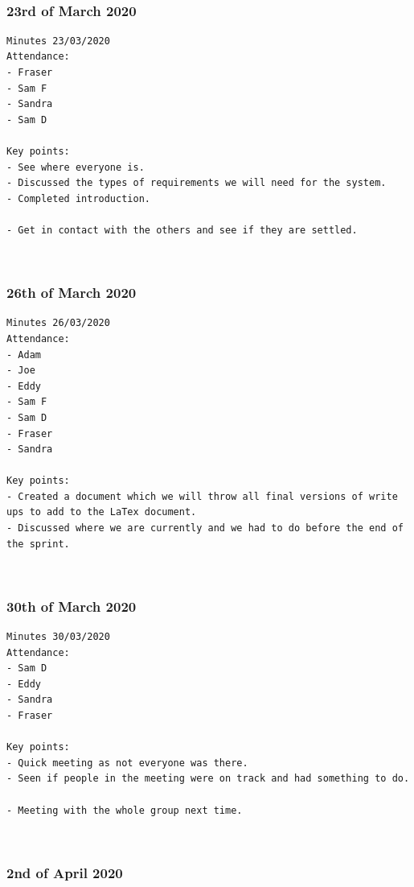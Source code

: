 \documentclass[10pt, notitlepage]{report}
\begin{document}
\leavevmode \\
\subsubsection{23rd of March 2020}

\begin{lstlisting}
Minutes 23/03/2020
Attendance:
- Fraser
- Sam F
- Sandra
- Sam D

Key points:
- See where everyone is. 
- Discussed the types of requirements we will need for the system.
- Completed introduction.

- Get in contact with the others and see if they are settled.
\end{lstlisting}

\leavevmode \\
\subsubsection{26th of March 2020}

\begin{lstlisting}
Minutes 26/03/2020
Attendance:
- Adam
- Joe
- Eddy
- Sam F
- Sam D
- Fraser
- Sandra

Key points:
- Created a document which we will throw all final versions of write ups to add to the LaTex document.
- Discussed where we are currently and we had to do before the end of the sprint.
\end{lstlisting}

\leavevmode \\
\subsubsection{30th of March 2020}

\begin{lstlisting}
Minutes 30/03/2020
Attendance:
- Sam D
- Eddy
- Sandra
- Fraser

Key points:
- Quick meeting as not everyone was there.
- Seen if people in the meeting were on track and had something to do.

- Meeting with the whole group next time.
\end{lstlisting}

\leavevmode \\
\subsubsection{2nd of April 2020}
\end{document}
